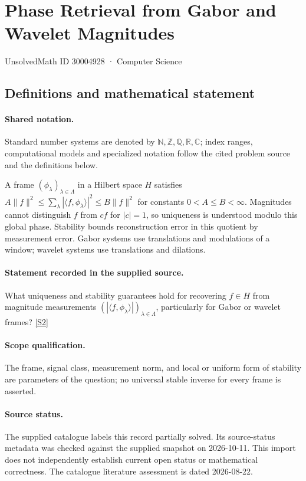 \documentclass[11pt]{article}
\newcommand{\sref}[2]{\hyperlink{source:#1:#2}{[S#2]}}
\begin{document}
\setcounter{section}{30004927}
\section{Phase Retrieval from Gabor and Wavelet Magnitudes}\label{30004928}
{\small\sffamily UnsolvedMath ID 30004928 · Computer Science}
\subsection{Definitions and mathematical statement}

\paragraph{Shared notation.}Standard number systems are denoted by $\mathbb N,\mathbb Z,\mathbb Q,\mathbb R,\mathbb C$; index ranges, computational models and specialized notation follow the cited problem source and the definitions below.


A frame $(\phi_\lambda)_{\lambda\in\Lambda}$ in a Hilbert space $H$ satisfies $A\|f\|^2\leq\sum_\lambda|\langle f,\phi_\lambda\rangle|^2\leq B\|f\|^2$ for constants $0<A\leq B<\infty$. Magnitudes cannot distinguish $f$ from $cf$ for $|c|=1$, so uniqueness is understood modulo this global phase. Stability bounds reconstruction error in this quotient by measurement error. Gabor systems use translations and modulations of a window; wavelet systems use translations and dilations.
\paragraph{Statement recorded in the supplied source.}
What uniqueness and stability guarantees hold for recovering $f\in H$ from magnitude measurements $(|\langle f,\phi_\lambda\rangle|)_{\lambda\in\Lambda}$, particularly for Gabor or wavelet frames? \sref{30004928}{2}
\paragraph{Scope qualification.}
The frame, signal class, measurement norm, and local or uniform form of stability are parameters of the question; no universal stable inverse for every frame is asserted.
\paragraph{Source status.}
The supplied catalogue labels this record partially solved. Its source-status metadata was checked against the supplied snapshot on 2026-10-11. This import does not independently establish current open status or mathematical correctness. The catalogue literature assessment is dated 2026-08-22.
\end{document}

